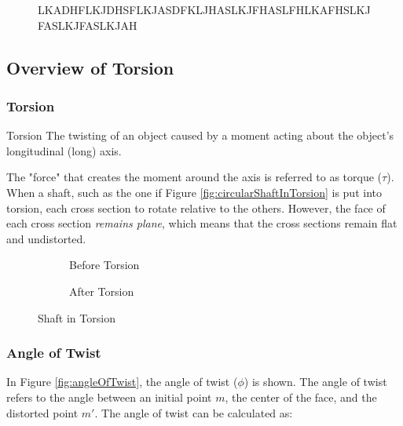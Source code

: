 \documentclass[12pt]{article}
\begin{document}
\begin{figure}[H]
  \centering
  
  \caption{LKADHFLKJDHSFLKJASDFKLJHASLKJFHASLFHLKAFHSLKJFASLKJFASLKJAH}
  \label{fig:037}
\end{figure}

\subsection{Overview of Torsion}
\label{ssec:overviewOfTorsion}

\subsubsection{Torsion}
\label{sssec:torsion}

\begin{definition}{Torsion}
  The twisting of an object caused by a moment acting about the object's longitudinal (long) axis.
\end{definition}

The "force" that creates the moment around the axis is referred to as torque ($\tau$). When a shaft, such as the one if Figure \ref{fig:circularShaftInTorsion} is put into torsion, each cross section to rotate relative to the others. However, the face of each cross section \textit{remains plane}, which means that the cross sections remain flat and undistorted.

\begin{figure}[H]
  \centering
  \begin{subfigure}[H]{0.45\textwidth}
    \centering
    
    \caption{Before Torsion}
    \label{fig:035}
  \end{subfigure}
  \begin{subfigure}[H]{0.45\textwidth}
    \centering
    
    \caption{After Torsion}
    \label{fig:036}
  \end{subfigure}
  \caption{Shaft in Torsion}
  \label{fig:shaftInTorsion}
\end{figure}

\subsubsection{Angle of Twist}
\label{sssec:angleOfTwist}

In Figure \ref{fig:angleOfTwist}, the angle of twist ($\phi$) is shown. The angle of twist refers to the angle between an initial point $m$, the center of the face, and the distorted point $m'$. The angle of twist can be calculated as:
\end{document}
